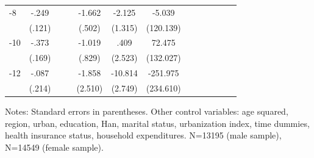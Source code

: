 \begin{table}[h]
\begin{adjustbox}{max width=\linewidth}
\begin{threeparttable}
{\begin{tabular}{l*{6}{S
S}}
-8             &    -.249\sym{**} &         &         &   -1.662\sym{***}&   -2.125         &   -5.039         \\
                &   (.121)         &         &         &   (.502)         &  (1.315)         &(120.139)         \\
-10            &    -.373\sym{**} &         &         &   -1.019         &     .409         &   72.475         \\
                &   (.169)         &         &         &   (.829)         &  (2.523)         &(132.027)         \\
-12           &    -.087         &         &         &   -1.858         &  -10.814\sym{***}& -251.975         \\
                &   (.214)         &         &         &  (2.510)         &  (2.749)         &(234.610)         \\
\bottomrule
\end{tabular}
\begin{tablenotes}
\item Notes:   Standard errors in parentheses.
Other control variables: age squared, region, urban, education, Han, marital status, urbanization index, time dummies, health insurance status, household expenditures. N=13195 (male sample), N=14549 (female sample).
\end{tablenotes}
}
\end{threeparttable}
\end{adjustbox}
\end{table}


\clearpage
